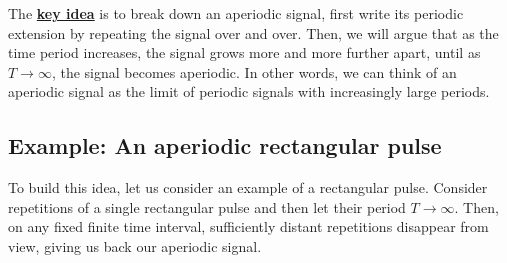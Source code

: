 The \ul{\textbf{key idea}} is to break down an aperiodic signal, first write its periodic extension by repeating the signal over and over. Then, we will argue that as the time period increases, the signal grows more and more further apart, until as $T\to\infty$, the signal becomes aperiodic. In other words, we can think of an aperiodic signal as the limit of periodic signals with increasingly large periods.

\subsection{Example: An aperiodic rectangular pulse} 
To build this idea, let us consider an example of a rectangular pulse. Consider repetitions of a single rectangular pulse and then let their period $T \to \infty$. Then, on any fixed finite time interval, sufficiently distant repetitions disappear from view, giving us back our aperiodic signal.

